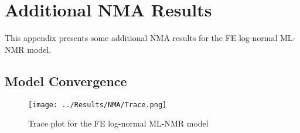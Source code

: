 \chapter{Additional NMA Results}\label{NMAAppendix}

This appendix presents some additional NMA results for the FE log-normal ML-NMR model. 

\section{Model Convergence}
\begin{figure}
    \centering
    \texttt{[image: ../Results/NMA/Trace.png]}
    \caption{Trace plot for the FE log-normal ML-NMR model}
    \label{fig:trace}
\end{figure}
